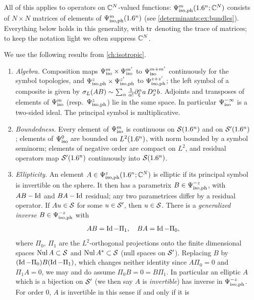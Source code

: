 All of this applies to operators on $\mathbb{C}^N$-valued functions:
$\Psi^{m}_{\mathrm{iso,ph}}(1.6^n;\mathbb{C}^N)$ consists of $N\times N$ matrices of elements of
$\Psi^{m}_{\mathrm{iso,ph}}(1.6^n)$ (see \cref{determinants:ex:bundles}). Everything below
holds in this generality, with $\operatorname{tr}$ denoting the trace of matrices; to keep
the notation light we often suppress $\mathbb{C}^N$.

We use the following results from \cref{ch:isotropic}.
\begin{enumerate}[label=(I\arabic*)]
\item\label{determinants:I:algebra} \emph{Algebra.} Composition maps
  $\Psi^{m}_{\mathrm{iso}}\times\Psi^{m'}_{\mathrm{iso}}$ to $\Psi^{m+m'}_{\mathrm{iso}}$ continuously for
  the symbol topologies, and $\Psi^{z}_{\mathrm{iso,ph}}\times\Psi^{z'}_{\mathrm{iso,ph}}$ to
  $\Psi^{z+z'}_{\mathrm{iso,ph}}$; the left symbol of a composite is given by
  $\sigma_L(AB)\sim\sum_\alpha\frac1{\alpha!}\partial_\xi^\alpha a\,D_x^\alpha b$.
  Adjoints and transposes of elements of $\Psi^{m}_{\mathrm{iso}}$ (resp.\ $\Psi^{z}_{\mathrm{iso,ph}}$)
  lie in the same space. In particular $\Psi^{-\infty}_{\mathrm{iso}}$ is a two-sided ideal.
  The principal symbol is multiplicative.
\item\label{determinants:I:bounded} \emph{Boundedness.} Every element of
  $\Psi^{m}_{\mathrm{iso}}$ is continuous on $\mathcal{S}(1.6^n)$ and on $\mathcal{S}'(1.6^n)$; elements
  of $\Psi^{0}_{\mathrm{iso}}$ are bounded on $L^2(1.6^n)$, with norm bounded by a symbol
  seminorm; elements of negative order are compact on $L^2$, and residual
  operators map $\mathcal{S}'(1.6^n)$ continuously into $\mathcal{S}(1.6^n)$.
\item\label{determinants:I:elliptic} \emph{Ellipticity.} An element
  $A\in\Psi^{z}_{\mathrm{iso,ph}}(1.6^n;\mathbb{C}^N)$ is elliptic if its principal symbol is invertible
  on the sphere. It then has a parametrix $B\in\Psi^{-z}_{\mathrm{iso,ph}}$, with $AB-\operatorname{Id}$ and
  $BA-\operatorname{Id}$ residual; any two parametrices differ by a residual operator.
  If $Au\in\mathcal{S}$ for some $u\in\mathcal{S}'$, then $u\in\mathcal{S}$. There is a
  \emph{generalized inverse} $B\in\Psi^{-z}_{\mathrm{iso,ph}}$ with
  \begin{equation}\label{determinants:eq:gen-inverse}
    AB=\operatorname{Id}-\Pi_1,\quad BA=\operatorname{Id}-\Pi_0,
  \end{equation}
  where $\Pi_0$, $\Pi_1$ are the $L^2$-orthogonal projections onto the finite
  dimensional spaces $\operatorname{Nul} A\subset\mathcal{S}$ and $\operatorname{Nul} A^*\subset\mathcal{S}$ (null spaces
  on $\mathcal{S}'$). Replacing $B$ by $(\operatorname{Id}-\Pi_0)B(\operatorname{Id}-\Pi_1)$, which changes
  neither identity since $A\Pi_0=0$ and $\Pi_1A=0$, we may and do assume
  $\Pi_0B=0=B\Pi_1$. In particular an elliptic $A$ which is a bijection on
  $\mathcal{S}'$ (we then say $A$ is \emph{invertible}) has inverse in $\Psi^{-z}_{\mathrm{iso,ph}}$.
  For order $0$, $A$ is invertible in this sense if and only if it is

\end{enumerate}
